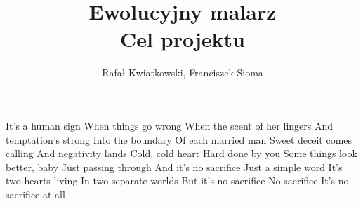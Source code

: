 \documentclass{article}
\title{Ewolucyjny malarz \\ \large Cel projektu}
\author{Rafał Kwiatkowski, Franciszek Sioma}
\begin{document}
\maketitle
{}
It's a human sign
When things go wrong
When the scent of her lingers
And temptation's strong
Into the boundary
Of each married man
Sweet deceit comes calling
And negativity lands
Cold, cold heart
Hard done by you
Some things look better, baby
Just passing through
And it's no sacrifice
Just a simple word
It's two hearts living
In two separate worlds
But it's no sacrifice
No sacrifice
It's no sacrifice at all
\end{document}
